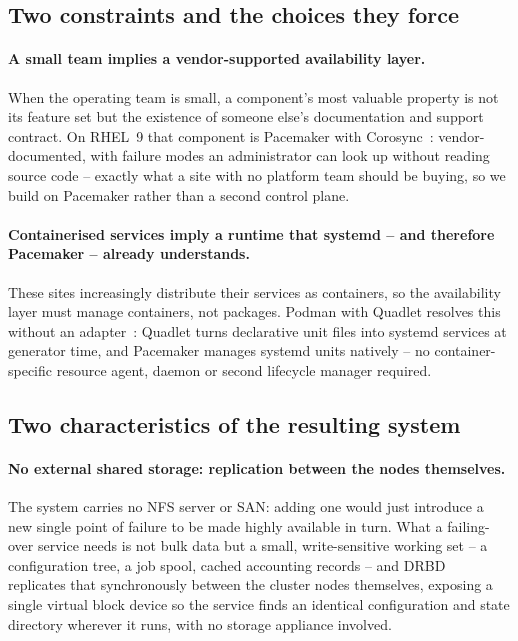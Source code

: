 \documentclass{webofc}
\begin{document}
\subsection{Two constraints and the choices they force}
\label{sec:choices}

\paragraph{A small team implies a vendor-supported availability layer.}
When the operating team is small, a component's most valuable property
is not its feature set but the existence of someone else's
documentation and support contract. On RHEL~9 that component is
Pacemaker with Corosync~\cite{pacemaker,corosync,rhelha}:
vendor-documented, with failure modes an administrator can look up
without reading source code -- exactly what a site with no platform team
should be buying, so we build on Pacemaker rather than a second control
plane.

\paragraph{Containerised services imply a runtime that systemd -- and
therefore Pacemaker -- already understands.}
These sites increasingly distribute their services as containers, so the
availability layer must manage containers, not packages. Podman with
Quadlet resolves this without an adapter~\cite{podman,quadlet}: Quadlet
turns declarative unit files into systemd services at generator time,
and Pacemaker manages systemd units natively -- no container-specific
resource agent, daemon or second lifecycle manager required.

\subsection{Two characteristics of the resulting system}

\paragraph{No external shared storage: replication between the nodes
themselves.} The system carries no NFS server or SAN: adding one would
just introduce a new single point of failure to be made highly available
in turn. What a failing-over service needs is not bulk data but a small,
write-sensitive working set -- a configuration tree, a job spool, cached
accounting records -- and DRBD~\cite{drbd9} replicates that synchronously
between the cluster nodes themselves, exposing a single virtual block
device so the service finds an identical configuration and state
directory wherever it runs, with no storage appliance involved.
\end{document}
